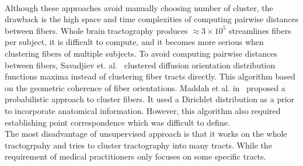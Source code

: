 \\Although these approaches avoid manually choosing number of cluster, the drawback is the high space and time complexities of computing pairwise distances between fibers. Whole brain tractography produces $\approx 3 \times 10^5$ streamlines fibers per subject, it is difficult to compute, and it becomes more serious when clustering fibers of multiple subjects. To avoid computing pairwise distances between fibers, Savadjiev et. al.~\cite{savadjiev2008streamline} clustered diffusion orientation distribution functions maxima instead of clustering fiber tracts directly. This algorithm based on the geometric coherence of fiber orientations. Maddah et al. in~\cite{maddah2008modeling} proposed a probabilistic approach to cluster fibers. It used a Dirichlet distribution as a prior to incorporate anatomical information. However, this algorithm also required establishing point correspondence which was difficult to define. 
\\The most disadvantage of unsupervised approach is that it works on the whole tractogrpahy and tries to cluster tractography into many tracts. While the requirement of medical practitioners only focuses on some specific tracts.   
